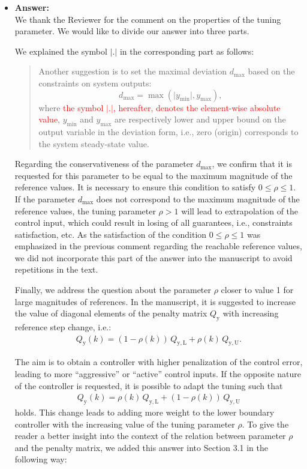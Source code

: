 \documentclass[a4paper,10pt]{article}
\newcommand{\change}[1]{\textcolor{red}{#1}}
\newcommand{\answer}[1]{
	\begin{itemize}
		\item[] \textbf{Answer:}\\ #1
	\end{itemize}
}
\begin{document}
	\answer{
		We thank the Reviewer for the comment on the properties of the tuning parameter. We would like to divide our answer into three parts.
		
		We explained the symbol $\lvert.\rvert$ in the corresponding part as follows:
		
		\begin{quote}
			Another suggestion is to set the maximal deviation $d_{\max}$ based on the constraints on system outputs: 
			\begin{equation} \tag{6}
				\label{eq:d_max}
				d_{\max} = \max(\vert y_{\min} \vert, y_{\max}),
			\end{equation}
			where \change{the symbol $\lvert.\rvert$, hereafter, denotes the element-wise absolute value}, $y_{\min}$ and $y_{\max}$ are respectively lower and upper bound on the output variable in the deviation form, i.e., zero (origin) corresponds to the system steady-state value. 
		\end{quote}
	
		Regarding the conservativeness of the parameter $d_{\max}$, we confirm that it is requested for this parameter to be equal to the maximum magnitude of the reference values. It is necessary to ensure this condition to satisfy $0 \le \rho \le 1$. If the parameter $d_{\max}$ does not correspond to the maximum magnitude of the reference values, the tuning parameter $\rho > 1$ will lead to extrapolation of the control input, which could result in losing of all guarantees, i.e., constraints satisfaction, etc. As the satisfaction of the condition $0 \le \rho \le 1$ was emphasized in the previous comment regarding the reachable reference values, we did not incorporate this part of the answer into the manuscript to avoid repetitions in the text.
		
		Finally, we address the question about the parameter $\rho$ closer to value 1 for large magnitudes of references. 			
		In the manuscript, it is suggested to increase the value of diagonal elements of the penalty matrix $Q_\mathrm{y}$ with increasing reference step change, i.e.:		
		\begin{eqnarray*}
			Q_\mathrm{y}(k) = (1-\rho(k)) \, Q_\mathrm{y,L} + \rho(k) \, Q_\mathrm{y,U}.
		\end{eqnarray*}
			
		The aim is to obtain a controller with higher penalization of the control error, leading to more ``aggressive'' or ``active'' control inputs.
		If the opposite nature of the controller is requested, it is possible to adapt the tuning such that 
		\begin{eqnarray*}
			Q_\mathrm{y}(k) = \rho(k) \, Q_\mathrm{y,L} + (1-\rho(k)) \, Q_\mathrm{y,U}
		\end{eqnarray*}
		holds. This change leads to adding more weight to the lower boundary controller with the increasing value of the tuning parameter $\rho$. To give the reader a better insight into the context of the relation between parameter $\rho$ and the penalty matrix, we added this answer into Section 3.1 in the following way:
				
}
\end{document}
